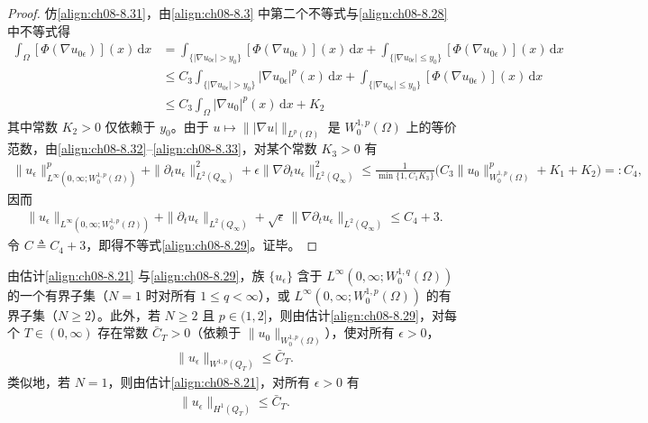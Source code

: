 \documentclass[../../main.tex]{subfiles}%
\begin{document}
\begin{proof}
仿\eqref{align:ch08-8.31}，由\eqref{align:ch08-8.3} 中第二个不等式与\eqref{align:ch08-8.28} 中不等式得
\begin{align}
\int_\Omega[\Phi(\nabla u_{0\epsilon})](x)\,\mathrm{d}x
&=\int_{\{|\nabla u_{0\epsilon}|>y_0\}}[\Phi(\nabla u_{0\epsilon})](x)\,\mathrm{d}x
+\int_{\{|\nabla u_{0\epsilon}|\leqslant y_0\}}[\Phi(\nabla u_{0\epsilon})](x)\,\mathrm{d}x\nonumber\\
&\leqslant C_3\int_{\{|\nabla u_{0\epsilon}|>y_0\}}|\nabla u_{0\epsilon}|^p(x)\,\mathrm{d}x
+\int_{\{|\nabla u_{0\epsilon}|\leqslant y_0\}}[\Phi(\nabla u_{0\epsilon})](x)\,\mathrm{d}x\nonumber\\
&\leqslant C_3\int_\Omega|\nabla u_0|^p(x)\,\mathrm{d}x+K_2 \label{align:ch08-8.33}
\end{align}
其中常数 $K_2>0$ 仅依赖于 $y_0$。由于 $u\mapsto\||\nabla u|\|_{L^p(\Omega)}$ 是 $W^{1,p}_0(\Omega)$ 上的等价范数，由\eqref{align:ch08-8.32}--\eqref{align:ch08-8.33}，对某个常数 $K_3>0$ 有
\begin{align*}
\|u_\epsilon\|^p_{L^\infty(0,\infty;W^{1,p}_0(\Omega))}
+\|\partial_t u_\epsilon\|^2_{L^2(Q_\infty)}
+\epsilon\|\nabla\partial_t u_\epsilon\|^2_{L^2(Q_\infty)}
\leqslant\frac{1}{\min\{1,C_1K_3\}}\big(C_3\|u_0\|^p_{W^{1,p}_0(\Omega)}+K_1+K_2\big)=:C_4,
\end{align*}
因而
\begin{align*}
\|u_\epsilon\|_{L^\infty(0,\infty;W^{1,p}_0(\Omega))}
+\|\partial_t u_\epsilon\|_{L^2(Q_\infty)}
+\sqrt{\epsilon}\,\|\nabla\partial_t u_\epsilon\|_{L^2(Q_\infty)}\leqslant C_4+3.
\end{align*}
令 $C\triangleq C_4+3$，即得不等式\eqref{align:ch08-8.29}。证毕。
\end{proof}

\begin{remark}\label{remark:ch08-W1p界}
由估计\eqref{align:ch08-8.21} 与\eqref{align:ch08-8.29}，族 $\{u_\epsilon\}$ 含于 $L^\infty(0,\infty;W^{1,q}_0(\Omega))$ 的一个有界子集（$N=1$ 时对所有 $1\leqslant q<\infty$），或 $L^\infty(0,\infty;W^{1,p}_0(\Omega))$ 的有界子集（$N\geqslant2$）。此外，若 $N\geqslant2$ 且 $p\in(1,2]$，则由估计\eqref{align:ch08-8.29}，对每个 $T\in(0,\infty)$ 存在常数 $\bar C_T>0$（依赖于 $\|u_0\|_{W^{1,p}_0(\Omega)}$），使对所有 $\epsilon>0$，
\begin{align}
\|u_\epsilon\|_{W^{1,p}(Q_T)}\leqslant\bar C_T. \label{align:ch08-8.34}
\end{align}
类似地，若 $N=1$，则由估计\eqref{align:ch08-8.21}，对所有 $\epsilon>0$ 有
\begin{align}
\|u_\epsilon\|_{H^1(Q_T)}\leqslant\bar C_T. \label{align:ch08-8.35}
\end{align}
\end{remark}
\end{document}
